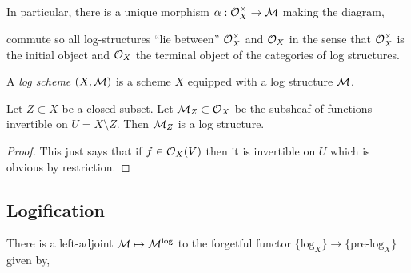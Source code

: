 \documentclass[12pt]{article}
\begin{document}
\begin{rmk}
In particular, there is a unique morphism $\alpha : \mathcal{O}_{X}^\times \to \mathcal{M}$ making the diagram,
\begin{center}
\end{center}
commute so all log-structures ``lie between'' $\mathcal{O}_{X}^\times$ and $\mathcal{O}_{X}$ in the sense that $\mathcal{O}_{X}^\times$ is the initial object and $\mathcal{O}_{X}$ the terminal object of the categories of log structures.
\end{rmk}

\begin{defn}
A \textit{log scheme} $(X, \mathcal{M})$ is a scheme $X$ equipped with a log structure $\mathcal{M}$.
\end{defn}

\begin{prop}
Let $Z \subset X$ be a closed subset. Let $\mathcal{M}_Z \subset \mathcal{O}_{X}$ be the subsheaf of functions invertible on $U = X \setminus Z$. Then $\mathcal{M}_Z$ is a log structure.
\end{prop}

\begin{proof}
This just says that if $f \in \mathcal{O}_{X}(V)$ then it is invertible on $U$ which is obvious by restriction. 
\end{proof}

\subsection{Logification}

\begin{prop}
There is a left-adjoint $\mathcal{M} \mapsto \mathcal{M}^{\log}$ to the forgetful functor $\{ \text{log}_X \} \to \{ \text{pre-log}_X \}$ given by,
\begin{center}
\end{center}
\end{prop}
\end{document}
